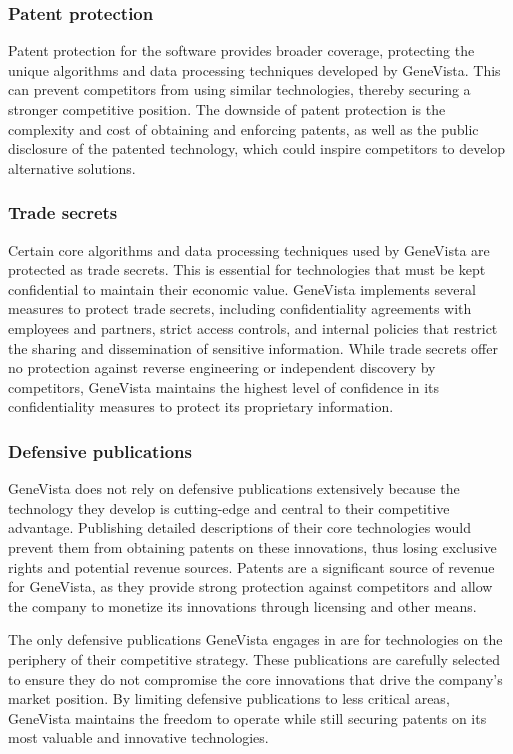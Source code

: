 \documentclass[a4paper]{article}
\begin{document}
\subsubsection{Patent protection}

Patent protection for the software provides broader coverage, protecting the unique algorithms and data processing techniques developed by GeneVista. This can prevent competitors from using similar technologies, thereby securing a stronger competitive position. The downside of patent protection is the complexity and cost of obtaining and enforcing patents, as well as the public disclosure of the patented technology, which could inspire competitors to develop alternative solutions.

\subsubsection{Trade secrets}

Certain core algorithms and data processing techniques used by GeneVista are protected as trade secrets. This is essential for technologies that must be kept confidential to maintain their economic value. GeneVista implements several measures to protect trade secrets, including confidentiality agreements with employees and partners, strict access controls, and internal policies that restrict the sharing and dissemination of sensitive information. While trade secrets offer no protection against reverse engineering or independent discovery by competitors, GeneVista maintains the highest level of confidence in its confidentiality measures to protect its proprietary information.

\subsubsection{Defensive publications}

GeneVista does not rely on defensive publications extensively because the technology they develop is cutting-edge and central to their competitive advantage. Publishing detailed descriptions of their core technologies would prevent them from obtaining patents on these innovations, thus losing exclusive rights and potential revenue sources. Patents are a significant source of revenue for GeneVista, as they provide strong protection against competitors and allow the company to monetize its innovations through licensing and other means.

The only defensive publications GeneVista engages in are for technologies on the periphery of their competitive strategy. These publications are carefully selected to ensure they do not compromise the core innovations that drive the company’s market position. By limiting defensive publications to less critical areas, GeneVista maintains the freedom to operate while still securing patents on its most valuable and innovative technologies.
\end{document}
